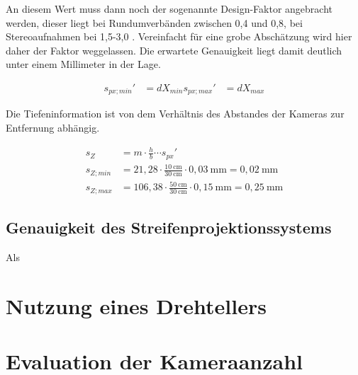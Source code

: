 \documentclass[./00PhotoBox.tex]{subfiles}
\begin{document}
An diesem Wert muss dann noch der sogenannte Design-Faktor angebracht werden, dieser liegt bei Rundumverbänden zwischen 0,4 und 0,8, bei Stereoaufnahmen bei 1,5-3,0 \citep[S. 174]{luhmann}. Vereinfacht für eine grobe Abschätzung wird hier daher der Faktor weggelassen. Die erwartete Genauigkeit liegt damit deutlich unter einem Millimeter in der Lage.

\begin{align}
    s_{px; min}' & = dX_{min}
    s_{px; max}' & = dX_{max}
\end{align}

Die Tiefeninformation ist von dem Verhältnis des Abstandes der Kameras zur Entfernung abhängig.

\begin{align}
    s_Z       & = m \cdot \frac{h}{b} \cdots s_{px}'                                                   \\
    s_{Z;min} & = 21,28 \cdot \frac{10~\text{cm}}{30~\text{cm}}\cdot 0,03~\text{mm}  = 0,02~\text{mm}  \\
    s_{Z;max} & = 106,38 \cdot \frac{50~\text{cm}}{30~\text{cm}} \cdot 0,15~\text{mm} = 0,25~\text{mm}
\end{align}



\subsection{Genauigkeit des Streifenprojektionssystems}
Als


\section{Nutzung eines Drehtellers}


\section{Evaluation der Kameraanzahl}

\biblio
\end{document}

